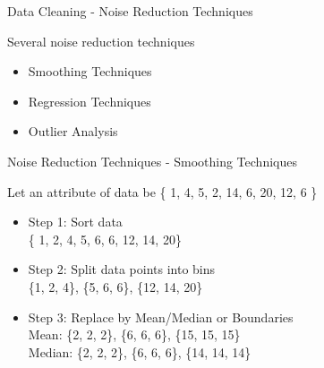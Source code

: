 \begin{frame}{Data Cleaning - Noise Reduction Techniques}

Several noise reduction techniques

\begin{itemize}
    \item Smoothing Techniques
    \item Regression Techniques
    \item Outlier Analysis
\end{itemize}
\end{frame}

\begin{frame}{Noise Reduction Techniques - Smoothing Techniques}
\begin{outline}
Let an attribute of data be \{ 1, 4, 5, 2, 14, 6, 20, 12, 6 \}
\begin{itemize}
    \item Step 1: Sort data \\
    \{ 1, 2, 4, 5, 6, 6, 12, 14, 20\}
    \item Step 2: Split data points into bins \\
    \{1, 2, 4\}, \{5, 6, 6\}, \{12, 14, 20\} 
    \item Step 3: Replace by Mean/Median or Boundaries \\ 
    Mean: \{2, 2, 2\}, \{6, 6, 6\}, \{15, 15, 15\} \\ 
    Median: \{2, 2, 2\}, \{6, 6, 6\}, \{14, 14, 14\}
\end{itemize}
\end{outline}
\end{frame}


